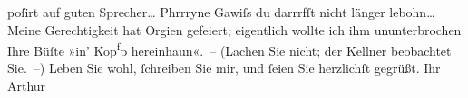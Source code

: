 \begin{ledgroupsized}[t]{13cm}
               poſirt auf guten Sprecher{\dots}\pend
           \pstart
           Phrrryne{\dotstwo}\pend
           \pstart
           Gawiſs {\dotstwo} du darrrfſt nicht länger lebohn{\dots}\pend
           \pstart
           Meine Gerechtigkeit hat Orgien {\pb}gefeiert; eigentlich
               wollte ich ihm ununterbrochen Ihre Büſte »in’  Kop\substVorne{}\textsuperscript{f}\substDazwischen{}p\substHinten{} hereinhaun«. – (Lachen Sie nicht; der Kellner beobachtet Sie. –)\pend
           \pstart
           Leben Sie wohl, ſchreiben Sie mir, und ſeien Sie herzlichſt gegrüßt.\pend
           \pstart Ihr \spacefill\mbox{Arthur}\pend{}\endnumbering{}\end{ledgroupsized}  \newcommand{\dateiname}{L00376}\newcommand{\titel}{Arthur Schnitzler an Richard Beer-Hofmann, 5. 10. 1894}\newcommand{\editorInnen}{Martin Anton Müller und Gerd-Hermann Susen}
            \footnotesize
\begin{ledgroupsized}[t]{11.5cm}
\end{ledgroupsized}
         
      
